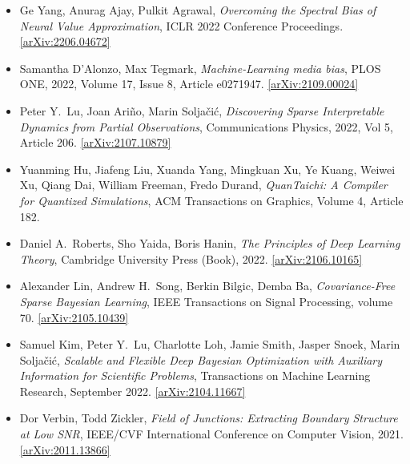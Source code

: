 \begin{itemize}
\item Ge Yang, Anurag Ajay, Pulkit Agrawal, \textit{Overcoming the Spectral Bias of Neural Value Approximation}, ICLR 2022 Conference Proceedings. \href{https://arxiv.org/abs/2206.04672}{[arXiv:2206.04672]} 
\item Samantha D'Alonzo, Max Tegmark, \textit{Machine-Learning media bias}, PLOS ONE, 2022, Volume 17, Issue 8, Article e0271947. \href{https://arxiv.org/abs/2109.00024}{[arXiv:2109.00024]} 
\item Peter Y.\  Lu, Joan Ariño, Marin Soljačić, \textit{Discovering Sparse Interpretable Dynamics from Partial Observations}, Communications Physics, 2022, Vol 5, Article 206. \href{https://arxiv.org/abs/2107.10879}{[arXiv:2107.10879]} 
\item Yuanming Hu, Jiafeng Liu, Xuanda Yang, Mingkuan Xu, Ye Kuang, Weiwei Xu, Qiang Dai, William Freeman, Fredo Durand, \textit{QuanTaichi: A Compiler for Quantized Simulations}, ACM Transactions on Graphics, Volume 4, Article 182. 
\item Daniel A.\  Roberts, Sho Yaida, Boris Hanin, \textit{The Principles of Deep Learning Theory}, Cambridge University Press (Book), 2022. \href{https://arxiv.org/abs/2106.10165}{[arXiv:2106.10165]} 
\item Alexander Lin, Andrew H.\  Song, Berkin Bilgic, Demba Ba, \textit{Covariance-Free Sparse Bayesian Learning}, IEEE Transactions on Signal Processing, volume 70. \href{https://arxiv.org/abs/2105.10439}{[arXiv:2105.10439]} 
\item Samuel Kim, Peter Y.\  Lu, Charlotte Loh, Jamie Smith, Jasper Snoek, Marin Soljačić, \textit{Scalable and Flexible Deep Bayesian Optimization with Auxiliary Information for Scientific Problems}, Transactions on Machine Learning Research, September 2022. \href{https://arxiv.org/abs/2104.11667}{[arXiv:2104.11667]} 
\item Dor Verbin, Todd Zickler, \textit{Field of Junctions: Extracting Boundary Structure at Low SNR}, IEEE/CVF International Conference on Computer Vision, 2021. \href{https://arxiv.org/abs/2011.13866}{[arXiv:2011.13866]} 
\end{itemize}